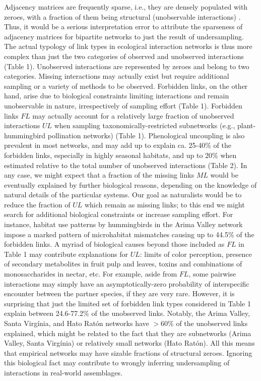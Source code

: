 \documentclass[12pt]{article}
\begin{document}
Adjacency matrices are frequently sparse, i.e., they are densely populated with zeroes, with a fraction of them being structural (unobservable interactions) \citep{Bascompte:2014to}. Thus, it would be a serious interpretation error to attribute the sparseness of adjacency matrices for bipartite networks to just the result of undersampling. The actual typology of link types in ecological interaction networks is thus more complex than just the two categories of observed and unobserved interactions (Table 1). Unobserved interactions are represented by zeroes and belong to two categories. Missing interactions may actually exist but require additional sampling or a variety of methods to be observed. Forbidden links, on the other hand, arise due to biological constraints limiting interactions and remain unobservable in nature, irrespectively of sampling effort (Table 1). Forbidden links $FL$ may actually account for a relatively large fraction of unobserved interactions $UL$ when sampling taxonomically-restricted subnetworks (e.g., plant-hummingbird pollination networks) (Table 1). Phenological uncoupling is also prevalent in most networks, and may add up to explain ca. 25-40\% of the forbidden links, especially in highly seasonal habitats, and up to 20\% when estimated relative to the total number of unobserved interactions (Table 2). In any case, we might expect that a fraction of the missing links $ML$ would be eventually explained by further biological reasons, depending on the knowledge of natural details of the particular systems. Our goal as naturalists would be to reduce the fraction of $UL$ which remain as missing links; to this end we might search for additional biological constraints or increase sampling effort. For instance, habitat use patterns by hummingbirds in the Arima Valley network \citep[Table 2; ][]{E31.616} impose a marked pattern of microhabitat mismatches causing up to 44.5\% of the forbidden links. A myriad of biological causes beyond those included as $FL$ in Table 1 may contribute explanations for $UL$: limits of color perception, presence of secondary metabolites in fruit pulp and leaves, toxins and combinations of monosaccharides in nectar, etc. For example, aside from $FL$, some pairwise interactions may simply have an asymptotically-zero probability of interspecific encounter between the partner species, if they are very rare. However, it is surprising that just the limited set of forbidden link types considered in Table 1 explain between 24.6-77.2\% of the unobserved links. Notably, the Arima Valley, Santa Virg\'inia, and Hato Rat\'on networks have $>60\%$ of the unobserved links explained, which might be related to the fact that they are subnetworks (Arima Valley, Santa Virg\'inia) or relatively small networks (Hato Rat\'on). All this means that empirical networks may have sizable fractions of structural zeroes. Ignoring this biological fact may contribute to wrongly inferring undersampling of interactions in real-world assemblages.
\end{document}
